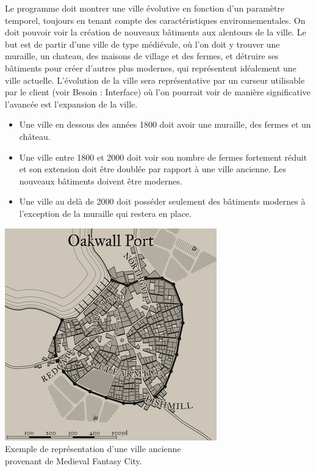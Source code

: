 {
Le programme doit montrer une ville évolutive en fonction d'un paramètre temporel, toujours en tenant compte des caractéristiques environnementales. On doit pouvoir voir la création de nouveaux bâtiments aux alentours de la ville. Le but est de partir d'une ville de type médiévale, où l'on doit y trouver une muraille, un chateau, des maisons de village et des fermes, et détruire ses bâtiments pour créer d'autres plus modernes, qui représentent idéalement une ville actuelle. L'évolution de la ville sera représentative par un curseur utilisable par le client (voir Besoin : Interface) où l'on pourrait voir de manière significative l'avancée est l'expansion de la ville.
	
\begin{itemize}
	\item Une ville en dessous des années 1800 doit avoir une muraille, des fermes et un château.
	\item Une ville entre 1800 et 2000 doit voir son nombre de fermes fortement réduit et son extension doit être doublée par rapport à une ville ancienne. Les nouveaux bâtiments doivent être modernes.
	\item Une ville au delà de 2000 doit posséder seulement des bâtiments modernes à l'exception de la muraille qui restera en place.
\end{itemize}

\begin{center}
    \centering
    \includegraphics[height = 3 cm]{images/24FsvM.png}\\
     \small{Exemple de représentation d'une ville ancienne \\
    provenant de Medieval Fantasy City.}
\end{center}
}
{}
